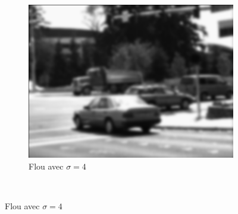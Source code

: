 \begin{enumerate}[questions, start=11]
\begin{figure}[!h]
\begin{subfigure}{0.3\textwidth}
  \includegraphics[width=\textwidth]{img/dumptruck-blur-4.png}
  \caption{Flou avec $\sigma = 4$}
  \end{subfigure}\\
  

\end{figure}
\end{enumerate}
